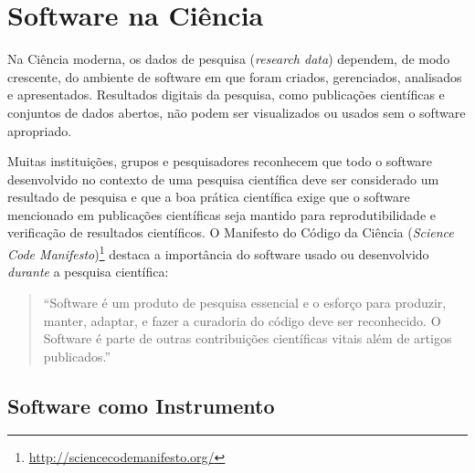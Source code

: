 \section{Software na Ciência} \label{sec:software:ciencia}

Na Ciência moderna, os dados de pesquisa (\textit{research data}) dependem, de modo crescente, do ambiente de software em que foram criados, gerenciados, analisados e apresentados. 
Resultados digitais da pesquisa, como publicações científicas e conjuntos de dados abertos, não podem ser visualizados ou usados sem o software apropriado. 

Muitas instituições, grupos e pesquisadores 
reconhecem que todo o software desenvolvido no contexto de uma pesquisa científica deve ser considerado um resultado de pesquisa \cite{jay_software_2021} e que 
a boa prática científica exige que o software mencionado em publicações científicas seja mantido para reprodutibilidade e verificação de resultados científicos.
%
O Manifesto do Código da Ciência (\textit{Science Code Manifesto})\footnote{\url{http://sciencecodemanifesto.org/}} destaca a importância do software usado ou desenvolvido \textit{durante} a pesquisa científica:
\begin{quote}
   ``Software é um produto de pesquisa essencial e o esforço para produzir, manter, adaptar, e fazer a curadoria do código deve ser reconhecido. O Software é parte de outras contribuições científicas vitais além de artigos publicados.''  
\end{quote}


\subsection{Software como Instrumento}

